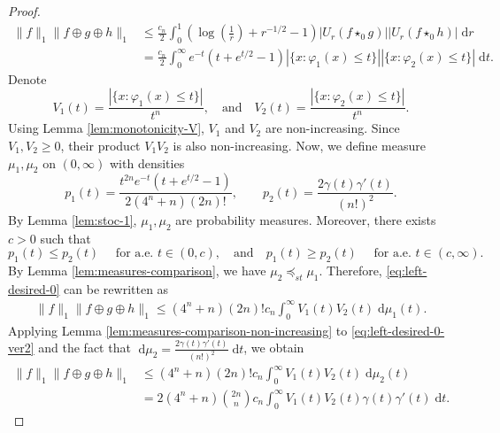 \documentclass[11pt]{amsart}
\theoremstyle{plain}
\theoremstyle{definition}
\theoremstyle{remark}
\begin{document}
\begin{proof}
        \begin{align}
            \|f\|_1 \|f \oplus g \oplus h\|_1
            & \leq \frac{c_n}{2} \int_0^1\left(\log \left(\frac{1}{r}\right)+r^{-1 / 2}-1\right)\left|U_r\left(f \star_0 g\right)\right|\left|U_r\left(f \star_0 h\right)\right|\;\mathrm  d r
            \\
            & = \frac{c_n}{2} \int_0^\infty e^{-t}(t +e^{t / 2}-1)\left|\{x : \varphi_1 (x) \leq t\}\right|\left|\{x : \varphi_2 (x) \leq t \}\right|\;\mathrm  d t. \label{eq:left-desired-0}
        \end{align}
        Denote
        \[
            V_1 (t) = \frac{|\{x : \varphi_1 (x) \leq t \}|}{t^n}, \quad \text{and} \quad  V_2 (t) = \frac{|\{x : \varphi_2 (x) \leq t \}|}{t^n}.
        \]
        Using Lemma \ref{lem:monotonicity-V}, $V_1$ and $V_2$ are non-increasing. Since $V_1,V_2 \geq 0$, their product $V_1V_2$ is also non-increasing.
        Now, we define measure $\mu_1,\mu_2 $ on $(0,\infty)$ with densities
        \[
            p_1 (t) = \frac{t^{2n}e^{-t}(t +e^{t / 2}-1)}{2(4^n+n)(2n)!},
            \qquad
            p_2 (t) = \frac{2 \gamma(t) \gamma '(t)}{(n!)^2}.
        \]
        By Lemma \ref{lem:stoc-1}, $\mu_1,\mu_2$ are probability measures. Moreover, there exists $c>0$ such that
        $$
        p_1(t) \leq p_2(t) \quad \text { for a.e. } t \in(0, c),
        \quad \text{and} \quad
        p_1(t) \geq p_2(t) \quad \text { for a.e. } t \in(c, \infty) .
        $$
        By Lemma \ref{lem:measures-comparison}, we have $\mu_2 \preceq_{st} \mu_1$.
        Therefore, \eqref{eq:left-desired-0} can be rewritten as
        \begin{align}
            \|f\|_1 \|f \oplus g \oplus h\|_1 \leq
            (4^n+n)(2n)!c_n \int_{0}^{\infty} V_1 (t) V_2 (t) \;\mathrm d \mu_1 (t). \label{eq:left-desired-0-ver2}
        \end{align}
        Applying Lemma \ref{lem:measures-comparison-non-increasing} to \eqref{eq:left-desired-0-ver2} and the fact that $ \;\mathrm d\mu_2 = \frac{2 \gamma(t) \gamma '(t)}{(n!)^2} \;\mathrm d t$, we obtain
        \begin{align}
            \|f\|_1 \|f \oplus g \oplus h\|_1
            &\leq
            (4^n+n)(2n)! c_n \int_{0}^{\infty} V_1 (t) V_2 (t) \;\mathrm d \mu_2 (t)
            \\
            &= 2(4^n+n)\binom{2n}{n}c_n \int_{0}^{\infty} V_1 (t) V_2 (t) \gamma(t) \gamma '(t) \;\mathrm d t. \label{eq:left-desired-0-ver3}
        \end{align}

\end{proof}
\end{document}
